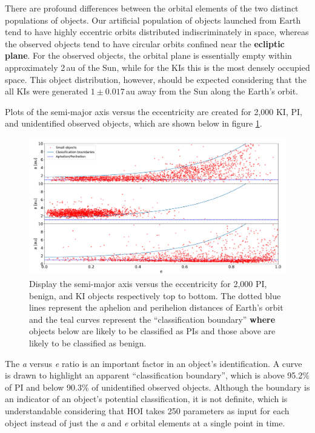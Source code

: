 \documentclass{aa}
\begin{document}
There are profound differences between the orbital elements of the two distinct populations of objects. Our artificial population of objects launched from Earth tend to have highly eccentric orbits distributed indiscriminately in space, whereas the observed objects tend to have circular orbits confined near the \textbf{ecliptic plane}. For the observed objects, the orbital plane is essentially empty within approximately 2\,au of the Sun, while for the KIs this is the most densely occupied space. This object distribution, however, should be expected considering that the all KIs were generated $1\pm0.017$\,au away from the Sun along the Earth's orbit.
                         
Plots of the semi-major axis versus the eccentricity are created for 2,000 KI, PI, and unidentified observed objects, which are shown below in figure \ref{FIG:AvsE}.
\begin{figure}[h]
	\hspace*{-0.50cm}
	\includegraphics[width=170mm]{images/6_AvsE.pdf}
	\centering
	\caption{\label{FIG:AvsE} Display the semi-major axis versus the eccentricity for 2,000 PI, benign, and KI objects respectively top to bottom. The dotted blue lines represent the aphelion and perihelion distances of Earth's orbit and the teal curves represent the ``classification boundary'' \textbf{where} objects below are likely to be classified as PIs and those above are likely to be classified as benign.}
\end{figure}
The \textit{a} versus \textit{e} ratio is an important factor in an object's identification. A curve is drawn to highlight an apparent ``classification boundary'', which is above 95.2\% of PI and below 90.3\% of unidentified observed objects. Although the boundary is an indicator of an object's potential classification, it is not definite, which is understandable considering that HOI takes 250 parameters as input for each object instead of just the \textit{a} and \textit{e} orbital elements at a single point in time. 
\end{document}
